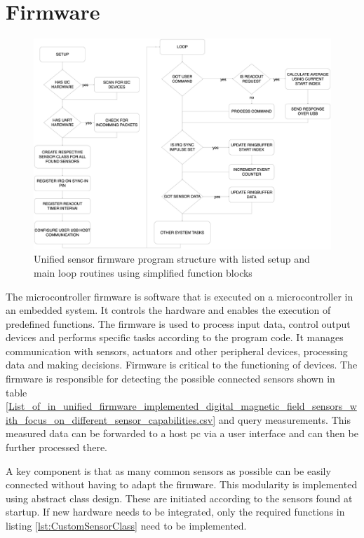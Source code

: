 \hypertarget{firmware}{%
\section{Firmware}\label{firmware}}

\begin{figure}
\centering
\includegraphics{./generated_images/border_Unified_sensor_firmware_program_structure_with_listed_setup_and_main_loop_routines_using_simplified_function_blocks.png}
\caption{Unified sensor firmware program structure with listed setup and
main loop routines using simplified function blocks
\label{Unified_sensor_firmware_program_structure_with_listed_setup_and_main_loop_routines_using_simplified_function_blocks.png}}
\end{figure}

The microcontroller firmware is software that is executed on a
microcontroller in an embedded system. It controls the hardware and
enables the execution of predefined functions. The firmware is used to
process input data, control output devices and performs specific tasks
according to the program code. It manages communication with sensors,
actuators and other peripheral devices, processing data and making
decisions. Firmware is critical to the functioning of devices. The
firmware is responsible for detecting the possible connected sensors
shown in table
\ref{List_of_in_unified_firmware_implemented_digital_magnetic_field_sensors_with_focus_on_different_sensor_capabilities.csv}
and query measurements. This measured data can be forwarded to a host
\gls{pc} via a user interface and can then be further processed there.

A key component is that as many common sensors as possible can be easily
connected without having to adapt the firmware. This modularity is
implemented using abstract class design. These are initiated according
to the sensors found at startup. If new hardware needs to be integrated,
only the required functions in listing \ref{lst:CustomSensorClass} need
to be implemented.

